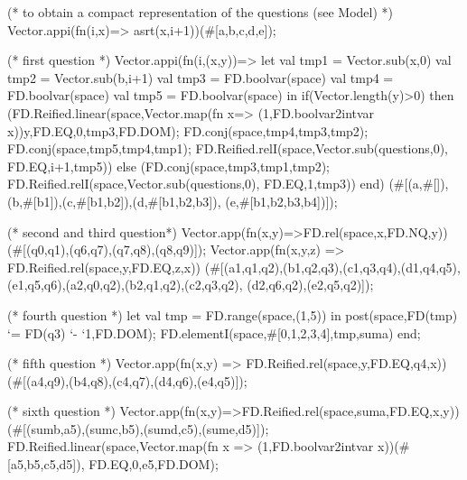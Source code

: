 \documentclass[a4paper]{scrartcl}
\begin{document}
\begin{myverbatim}
       (*  to obtain a compact representation of the questions
          (see Model) *)                              
        Vector.appi(fn(i,x)=> asrt(x,i+1))(#[a,b,c,d,e]);
           
       (* first question *)
        Vector.appi(fn(i,(x,y))=>
         let
             val tmp1 = Vector.sub(x,0)
             val tmp2 = Vector.sub(b,i+1)
             val tmp3 = FD.boolvar(space)
             val tmp4 = FD.boolvar(space)
             val tmp5 = FD.boolvar(space)
         in
             if(Vector.length(y)>0) 
             then
               (FD.Reified.linear(space,Vector.map(fn x=>
               (1,FD.boolvar2intvar x))y,FD.EQ,0,tmp3,FD.DOM);
                FD.conj(space,tmp4,tmp3,tmp2);
                FD.conj(space,tmp5,tmp4,tmp1);
                FD.Reified.relI(space,Vector.sub(questions,0),
                                      FD.EQ,i+1,tmp5))
             else
               (FD.conj(space,tmp3,tmp1,tmp2);
                FD.Reified.relI(space,Vector.sub(questions,0),
                                      FD.EQ,1,tmp3))
         end)
            (#[(a,#[]),(b,#[b1]),(c,#[b1,b2]),(d,#[b1,b2,b3]),
                 (e,#[b1,b2,b3,b4])]); 
            
           
       (* second and third question*)
        Vector.app(fn(x,y)=>FD.rel(space,x,FD.NQ,y))
                  (#[(q0,q1),(q6,q7),(q7,q8),(q8,q9)]);
        Vector.app(fn(x,y,z) => FD.Reified.rel(space,y,FD.EQ,z,x))
                    (#[(a1,q1,q2),(b1,q2,q3),(c1,q3,q4),(d1,q4,q5),
                       (e1,q5,q6),(a2,q0,q2),(b2,q1,q2),(c2,q3,q2),
                       (d2,q6,q2),(e2,q5,q2)]);
                         
       (* fourth question *)
        let 
            val tmp = FD.range(space,(1,5))
        in 
            post(space,FD(tmp) `= FD(q3) `- `1,FD.DOM);
            FD.elementI(space,#[0,1,2,3,4],tmp,suma)
        end;
            
       (* fifth question *)
        Vector.app(fn(x,y) => FD.Reified.rel(space,y,FD.EQ,q4,x))
                  (#[(a4,q9),(b4,q8),(c4,q7),(d4,q6),(e4,q5)]);
                      
       (* sixth question *)
        Vector.app(fn(x,y)=>FD.Reified.rel(space,suma,FD.EQ,x,y))
                    (#[(sumb,a5),(sumc,b5),(sumd,c5),(sume,d5)]);
        FD.Reified.linear(space,Vector.map(fn x =>
                        (1,FD.boolvar2intvar x))(#[a5,b5,c5,d5]),
                         FD.EQ,0,e5,FD.DOM); 
            

\end{myverbatim}
\end{document}
